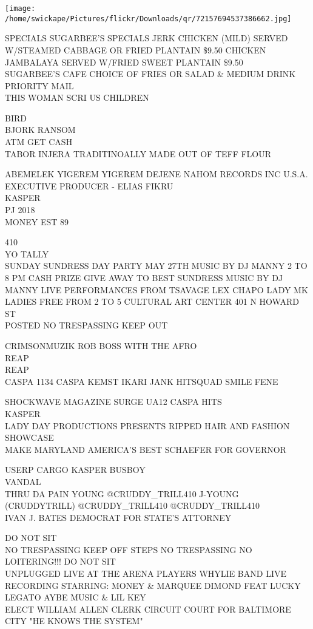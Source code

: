 \documentclass[10pt,letterpaper]{article}
\begin{document}
\texttt{[image: /home/swickape/Pictures/flickr/Downloads/qr/72157694537386662.jpg]}


SPECIALS SUGARBEE'S SPECIALS JERK CHICKEN (MILD) SERVED W/STEAMED CABBAGE OR FRIED PLANTAIN \$9.50 CHICKEN JAMBALAYA SERVED W/FRIED SWEET PLANTAIN \$9.50\\
SUGARBEE'S CAFE CHOICE OF FRIES OR SALAD \& MEDIUM DRINK\\
PRIORITY MAIL\\
THIS WOMAN SCRI US CHILDREN

BIRD\\
BJORK RANSOM\\
ATM GET CASH\\
TABOR INJERA TRADITINOALLY MADE OUT OF TEFF FLOUR

ABEMELEK YIGEREM YIGEREM DEJENE NAHOM RECORDS INC U.S.A. EXECUTIVE PRODUCER {-} ELIAS FIKRU\\
KASPER\\
PJ 2018\\
MONEY EST 89

410\\
YO TALLY\\
SUNDAY SUNDRESS DAY PARTY MAY 27TH MUSIC BY DJ MANNY 2 TO 8 PM CASH PRIZE GIVE AWAY TO BEST SUNDRESS MUSIC BY DJ MANNY LIVE PERFORMANCES FROM TSAVAGE LEX CHAPO LADY MK LADIES FREE FROM 2 TO 5 CULTURAL ART CENTER 401 N HOWARD ST\\
POSTED NO TRESPASSING KEEP OUT

CRIMSONMUZIK ROB BOSS WITH THE AFRO\\
REAP\\
REAP\\
CASPA 1134 CASPA KEMST IKARI JANK HITSQUAD SMILE FENE

SHOCKWAVE MAGAZINE SURGE UA12 CASPA HITS\\
KASPER\\
LADY DAY PRODUCTIONS PRESENTS RIPPED HAIR AND FASHION SHOWCASE\\
MAKE MARYLAND AMERICA'S BEST SCHAEFER FOR GOVERNOR

USERP CARGO KASPER BUSBOY\\
VANDAL\\
THRU DA PAIN YOUNG @CRUDDY\_TRILL410 J{-}YOUNG (CRUDDYTRILL) @CRUDDY\_TRILL410 @CRUDDY\_TRILL410\\
IVAN J. BATES DEMOCRAT FOR STATE'S ATTORNEY

DO NOT SIT\\
NO TRESPASSING KEEP OFF STEPS NO TRESPASSING NO LOITERING!!! DO NOT SIT\\
UNPLUGGED LIVE AT THE ARENA PLAYERS WHYLIE BAND LIVE RECORDING STARRING: MONEY \& MARQUEE DIMOND FEAT LUCKY LEGATO AYBE MUSIC \& LIL KEY\\
ELECT WILLIAM ALLEN CLERK CIRCUIT COURT FOR BALTIMORE CITY "HE KNOWS THE SYSTEM"
\end{document}
